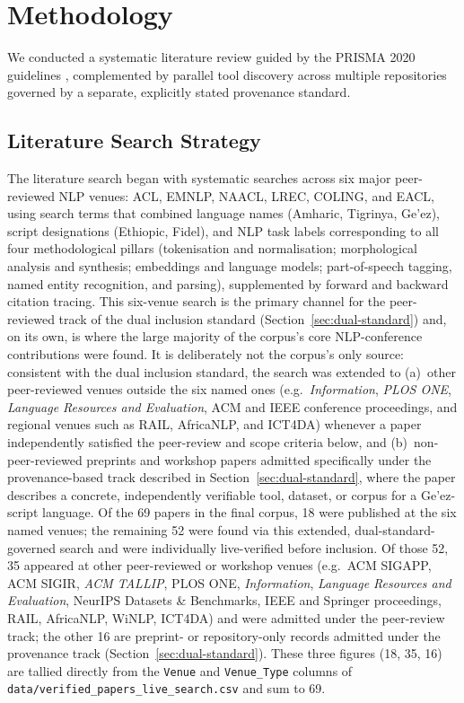 \documentclass[sn-mathphys-num]{sn-jnl}
\theoremstyle{thmstyleone}
\theoremstyle{thmstyletwo}
\theoremstyle{thmstylethree}
\begin{document}
\section{Methodology}\label{sec:methodology}

We conducted a systematic literature review guided by the PRISMA 2020 guidelines \citep{page_prisma_2021}, complemented by parallel tool discovery across multiple repositories governed by a separate, explicitly stated provenance standard.

\subsection{Literature Search Strategy}\label{sec:literature-search}

The literature search began with systematic searches across six major peer-reviewed NLP venues: ACL, EMNLP, NAACL, LREC, COLING, and EACL, using search terms that combined language names (Amharic, Tigrinya, Ge'ez), script designations (Ethiopic, Fidel), and NLP task labels corresponding to all four methodological pillars (tokenisation and normalisation; morphological analysis and synthesis; embeddings and language models; part-of-speech tagging, named entity recognition, and parsing), supplemented by forward and backward citation tracing. This six-venue search is the primary channel for the peer-reviewed track of the dual inclusion standard (Section~\ref{sec:dual-standard}) and, on its own, is where the large majority of the corpus's core NLP-conference contributions were found. It is deliberately not the corpus's only source: consistent with the dual inclusion standard, the search was extended to (a)~other peer-reviewed venues outside the six named ones (e.g.\ \emph{Information}, \emph{PLOS ONE}, \emph{Language Resources and Evaluation}, ACM and IEEE conference proceedings, and regional venues such as RAIL, AfricaNLP, and ICT4DA) whenever a paper independently satisfied the peer-review and scope criteria below, and (b)~non-peer-reviewed preprints and workshop papers admitted specifically under the provenance-based track described in Section~\ref{sec:dual-standard}, where the paper describes a concrete, independently verifiable tool, dataset, or corpus for a Ge'ez-script language. Of the 69 papers in the final corpus, 18 were published at the six named venues; the remaining 52 were found via this extended, dual-standard-governed search and were individually live-verified before inclusion. Of those 52, 35 appeared at other peer-reviewed or workshop venues (e.g.\ ACM SIGAPP, ACM SIGIR, \emph{ACM TALLIP}, PLOS ONE, \emph{Information}, \emph{Language Resources and Evaluation}, NeurIPS Datasets \& Benchmarks, IEEE and Springer proceedings, RAIL, AfricaNLP, WiNLP, ICT4DA) and were admitted under the peer-review track; the other 16 are preprint- or repository-only records admitted under the provenance track (Section~\ref{sec:dual-standard}). These three figures (18, 35, 16) are tallied directly from the \texttt{Venue} and \texttt{Venue\_Type} columns of \texttt{data/verified\_papers\_live\_search.csv} and sum to 69.
\end{document}
